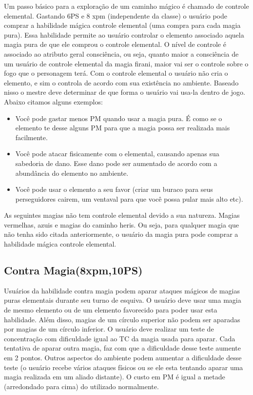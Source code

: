Um passo básico para a exploração de um caminho mágico é chamado de controle elemental. Gastando 6PS e 8 xpm (independente da classe) o usuário pode comprar a habilidade mágica controle elemental (uma compra para cada magia pura). Essa habilidade permite ao usuário controlar o elemento associado aquela magia pura de que ele comprou o controle elemental. O nível de controle é associado ao atributo geral consciência, ou seja, quanto maior a consciência de um usuário de controle elemental da magia firani, maior vai ser o controle sobre o fogo que o personagem terá. Com o controle elemental o usuário não cria o elemento, e sim o controla de acordo com sua existência no ambiente. Baseado nisso o mestre deve determinar de que forma o usuário vai usa-la dentro de jogo. Abaixo citamos alguns exemplos:

\begin{itemize}
	\item Você pode gastar menos PM quando usar a magia pura. É como se o elemento te desse alguns PM para que a magia possa ser realizada mais facilmente.
	\item Você pode atacar fisicamente com o elemental, causando apenas sua sabedoria de dano. Esse dano pode ser aumentado de acordo com a abundância do elemento no ambiente.
	\item Você pode usar o elemento a seu favor (criar um buraco para seus perseguidores cairem, um ventaval para que você possa pular mais alto etc).
\end{itemize}

As seguintes magias não tem controle elemental devido a sua natureza. Magias vermelhas, azuis e magias do caminho heris. Ou seja, para qualquer magia que não tenha sido citada anteriormente, o usuário da magia pura pode comprar a habilidade mágica controle elemental.

\subsection {Contra Magia(8xpm,10PS)}

Usuários da habilidade contra magia podem aparar ataques mágicos de magias puras elementais durante seu turno de esquiva. O usuário deve usar uma magia de mesmo elemento ou de um elemento favorecido para poder usar esta habilidade. Além disso, magias de um círculo superior não podem ser aparadas por magias de um círculo inferior. O usuário deve realizar um teste de concentração com dificuldade igual ao TC da magia usada para aparar. Cada tentativa de aparar outra magia, faz com que a dificuldade desse teste aumente em 2 pontos. Outros aspectos do ambiente podem aumentar a dificuldade desse teste (o usuário recebe vários ataques físicos ou se ele esta tentando aparar uma magia realizada em um aliado distante). O custo em PM é igual a metade (arredondado para cima) do utilizado normalmente.


